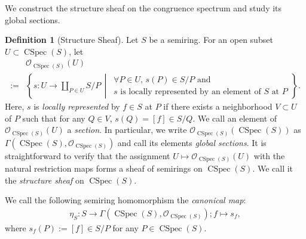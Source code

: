 \documentclass[a4paper,12pt]{amsart}
\theoremstyle{plain}
\theoremstyle{definition}
\newtheorem{definition}[theorem]{Definition}
\begin{document}
We construct the structure sheaf on the congruence spectrum and study its global sections.

\begin{definition}[Structure Sheaf]
    \label{dfn1}
Let $S$ be a semiring.
For an open subset $U \subset \operatorname{CSpec}(S)$, let 
\begin{align*}
&\mathcal{O}_{\operatorname{CSpec}(S)}(U) \\
:=& \left\{ s : U \to \coprod_{P \in U} S/P \,\middle|\, \begin{array}{l} \forall P \in U, \, s(P) \in S/P \text{ and } \\ s \text{ is locally represented by an element of } S \text{ at } P \end{array} \right\}.  
\end{align*}
Here, $s$ is \textit{locally represented} by $f \in S$ at $P$ if there exists a neighborhood $V \subset U$ of $P$ such that for any $Q \in V$, $s(Q) = [f] \in S / Q$.
We call an element of $\mathcal{O}_{\operatorname{CSpec}(S)}(U)$ a \textit{section}.
In particular, we write $\mathcal{O}_{\operatorname{CSpec}(S)}(\operatorname{CSpec}(S))$ as $\Gamma(\operatorname{CSpec}(S), \mathcal{O}_{\operatorname{CSpec}(S)})$ and call its elements \textit{global sections}.
It is straightforward to verify that the assignment $U \mapsto \mathcal{O}_{\operatorname{CSpec}(S)}(U)$ with the natural restriction maps forms a sheaf of semirings on $\operatorname{CSpec}(S)$. 
We call it the \textit{structure sheaf} on $\operatorname{CSpec}(S)$.

We call the following semiring homomorphism the \textit{canonical map}:
\begin{align*}
    \eta_S : S \to \Gamma(\operatorname{CSpec}(S), \mathcal{O}_{\operatorname{CSpec}(S)}); f \mapsto s_f,
\end{align*}
where $s_f(P) := [f] \in S/P$ for any $P \in \operatorname{CSpec}(S)$.
\end{definition}
\end{document}
